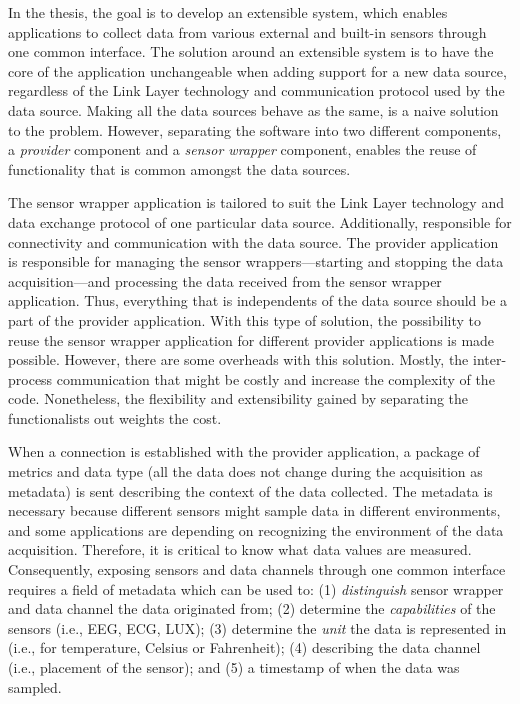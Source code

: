 In the thesis, the goal is to develop an extensible system, which enables applications to collect data from various external and built-in sensors through one common interface. The solution around an extensible system is to have the core of the application unchangeable when adding support for a new data source, regardless of the Link Layer technology and communication protocol used by the data source. Making all the data sources behave as the same, is a naive solution to the problem. However, separating the software into two different components, a \textit{provider} component and a \textit{sensor wrapper} component, enables the reuse of functionality that is common amongst the data sources. 

The sensor wrapper application is tailored to suit the Link Layer technology and data exchange protocol of one particular data source. Additionally, responsible for connectivity and communication with the data source. The provider application is responsible for managing the sensor wrappers---starting and stopping the data acquisition---and processing the data received from the sensor wrapper application. Thus, everything that is independents of the data source should be a part of the provider application. With this type of solution, the possibility to reuse the sensor wrapper application for different provider applications is made possible. However, there are some overheads with this solution. Mostly, the inter-process communication that might be costly and increase the complexity of the code. Nonetheless, the flexibility and extensibility gained by separating the functionalists out weights the cost.

When a connection is established with the provider application, a package of metrics and data type (all the data does not change during the acquisition as metadata) is sent describing the context of the data collected. The metadata is necessary because different sensors might sample data in different environments, and some applications are depending on recognizing the environment of the data acquisition. Therefore, it is critical to know what data values are measured. Consequently, exposing sensors and data channels through one common interface requires a field of metadata which can be used to: (1) \textit{distinguish} sensor wrapper and data channel the data originated from; (2) determine the \textit{capabilities} of the sensors (i.e., EEG, ECG, LUX); (3) determine the \textit{unit} the data is represented in (i.e., for temperature, Celsius or Fahrenheit); (4) describing the data channel (i.e., placement of the sensor); and (5) a timestamp of when the data was sampled. 

